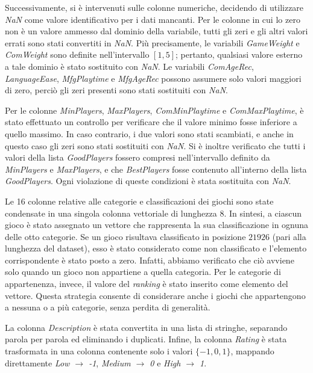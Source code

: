 \documentclass[10pt,twocolumn]{article}
\begin{document}
\smallskip

Successivamente, si è intervenuti sulle colonne numeriche, decidendo di utilizzare \textit{NaN} come valore identificativo per i dati mancanti. 
Per le colonne in cui lo zero non è un valore ammesso dal dominio della variabile, tutti gli zeri e gli altri valori errati sono stati convertiti in \textit{NaN}. 
Più precisamente, le variabili \textit{GameWeight} e \textit{ComWeight} sono definite nell’intervallo $[1,5]$; pertanto, qualsiasi valore esterno a tale dominio è stato sostituito con \textit{NaN}. 
Le variabili \textit{ComAgeRec}, \textit{LanguageEase}, \textit{MfgPlaytime} e \textit{MfgAgeRec} possono assumere solo valori maggiori di zero, perciò gli zeri presenti sono stati sostituiti con \textit{NaN}.

\smallskip

Per le colonne \textit{MinPlayers}, \textit{MaxPlayers}, \textit{ComMinPlaytime} e \textit{ComMaxPlaytime}, è stato effettuato un controllo per verificare che il valore minimo fosse inferiore a quello massimo. In caso contrario, i due valori sono stati scambiati, e anche in questo caso gli zeri sono stati sostituiti con \textit{NaN}. 
Si è inoltre verificato che tutti i valori della lista \textit{GoodPlayers} fossero compresi nell’intervallo definito da \textit{MinPlayers} e \textit{MaxPlayers}, e che \textit{BestPlayers} fosse contenuto all’interno della lista \textit{GoodPlayers}. 
Ogni violazione di queste condizioni è stata sostituita con \textit{NaN}.

\smallskip

Le 16 colonne relative alle categorie e classificazioni dei giochi sono state condensate in una singola colonna vettoriale di lunghezza 8. 
In sintesi, a ciascun gioco è stato assegnato un vettore che rappresenta la sua classificazione in ognuna delle otto categorie. 
Se un gioco risultava classificato in posizione $21926$ (pari alla lunghezza del dataset), esso è stato considerato come non classificato e l’elemento corrispondente è stato posto a zero. Infatti, abbiamo verificato che ciò avviene solo quando un gioco non appartiene a quella categoria. 
Per le categorie di appartenenza, invece, il valore del \textit{ranking} è stato inserito come elemento del vettore. 
Questa strategia consente di considerare anche i giochi che appartengono a nessuna o a più categorie, senza perdita di generalità.

\smallskip

La colonna \textit{Description} è stata convertita in una lista di stringhe, separando parola per parola ed eliminando i duplicati. 
Infine, la colonna \textit{Rating} è stata trasformata in una colonna contenente solo i valori $\{-1, 0, 1\}$, mappando direttamente \textit{Low $\rightarrow$ -1}, \textit{Medium $\rightarrow$ 0} e \textit{High $\rightarrow$ 1}.
\end{document}
